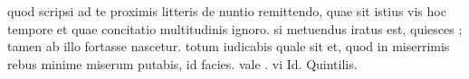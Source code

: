 


quod scripsi ad te proximis litteris de nuntio remittendo, quae sit istius vis hoc tempore et quae concitatio multitudinis ignoro. si metuendus iratus est, quiesces ; tamen ab illo fortasse nascetur. totum iudicabis quale sit et, quod in miserrimis rebus minime miserum putabis, id facies. vale . vi Id. Quintilis.
